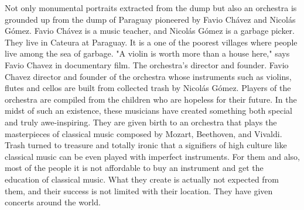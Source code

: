 Not only monumental portraits extracted from the dump but also an orchestra is grounded up from the dump of Paraguay pioneered by Favio Chávez and Nicolás Gómez. Favio Chávez is a music teacher, and Nicolás Gómez is a garbage picker. They live in Cateura at Paraguay. It is a one of the poorest villages where people live among the sea of garbage. "A violin is worth more than a house here," says Favio Chavez in documentary film. The orchestra's director and founder. Favio Chavez director and founder of the orchestra whose instruments such as violins, flutes and cellos are built from collected trash by Nicolás Gómez. Players of the orchestra are compiled from the children who are hopeless for their future. In the midst of such an existence, these musicians have created something both special and truly awe-inspiring. They are given birth to an orchestra that plays the masterpieces of classical music composed by Mozart, Beethoven, and Vivaldi. Trash turned to treasure and totally ironic that a signifiers of high culture like classical music can be even played with imperfect instruments. For them and also, most of the people it is not affordable to buy an instrument and get the education of classical music. What they create is actually not expected from them, and their success is not limited with their location. They have given concerts around the world. 



